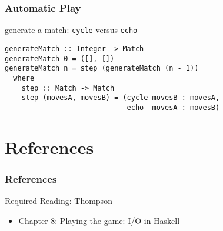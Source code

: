 \documentclass[dvipsnames]{beamer}
\theoremstyle{plain}
\begin{document}
\begin{frame}[fragile]
  \frametitle{Automatic Play}

  \begin{exampleblock}{generate a match:
      \lstinline[deletekeywords={cycle}]|cycle| versus \lstinline|echo|}
    \begin{lstlisting}[deletekeywords={cycle}]
generateMatch :: Integer -> Match
generateMatch 0 = ([], [])
generateMatch n = step (generateMatch (n - 1))
  where
    step :: Match -> Match
    step (movesA, movesB) = (cycle movesB : movesA,
                             echo  movesA : movesB)
    \end{lstlisting}
  \end{exampleblock}
\end{frame}

\section*{References}

\begin{frame}
  \frametitle{References}

  \begin{block}{Required Reading: Thompson}
    \begin{itemize}
      \item Chapter 8: \alert{Playing the game: I/O in Haskell}
    \end{itemize}
  \end{block}
\end{frame}
\end{document}
